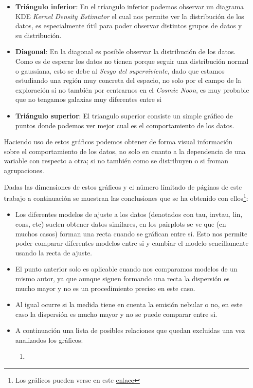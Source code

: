 \documentclass[11pt, a4paper]{article} %
\begin{document}
\begin{itemize}
    \item \textbf{Triángulo inferior}: En el tríangulo inferior podemos observar un diagrama KDE \textit{Kernel Density Estimator} el cual nos 
    permite ver la distribución de los datos, es especialmente útil para poder observar distintos grupos de datos y su distribución.
    \item \textbf{Diagonal}: En la diagonal es posible observar la distribución de los datos. Como es de esperar los datos no tienen porque seguir una distribución normal o gaussiana, esto se debe al \textit{Sesgo del superviviente}, dado que estamos estudiando
     una región muy concreta del espacio, no solo por el campo de la exploración si no también por centrarnos en el \textit{Cosmic Noon}, es muy probable que no tengamos galaxias muy diferentes entre si
    \item \textbf{Triángulo superior}: El triangulo superior consiste un simple gráfico de puntos donde podemos ver mejor cual es el comportamiento de los datos.
    
\end{itemize}

Haciendo uso de estos gráficos podemos obtener de forma visual información sobre el comportamiento de los datos, no solo en cuanto a la dependencia de una variable con respecto a otra; si no 
también como se distribuyen o si froman agrupaciones. 

Dadas las dimensiones de estos gráficos y el número límitado de páginas de este trabajo a continuación se muestran las conclusiones que se ha obtenido con ellos\footnote{Los gráficos pueden verse en este \href{https://github.com/PhyAMR/TFG/tree/main/custom_pairplots}{enlace}}:


\begin{itemize}
    \item Los diferentes modelos de ajuste a los datos (denotados con tau, invtau, lin, cons, etc) 
    suelen obtener datos similares, en los pairplots se ve que (en muchos casos) forman una recta cuando se gráfican entre sí. Esto nos permite poder comparar diferentes modelos entre si y cambiar el modelo sencillamente usando la recta de ajuste.
    \item El punto anterior solo es aplicable cuando nos comparamos modelos de un mismo autor, ya que aunque siguen formando una recta la dispersión es mucho mayor y no es un procedimiento preciso en este caso.
    \item Al igual ocurre si la medida tiene en cuenta la emisión nebular o no, en este caso la dispersión es mucho mayor y no se puede comparar entre si.
    \item A continuación una lista de posibles relaciones que quedan excluidas una vez analizados los gráficos:
    \begin{enumerate}
        \item 
    \end{enumerate}
\end{itemize}
\end{document}
